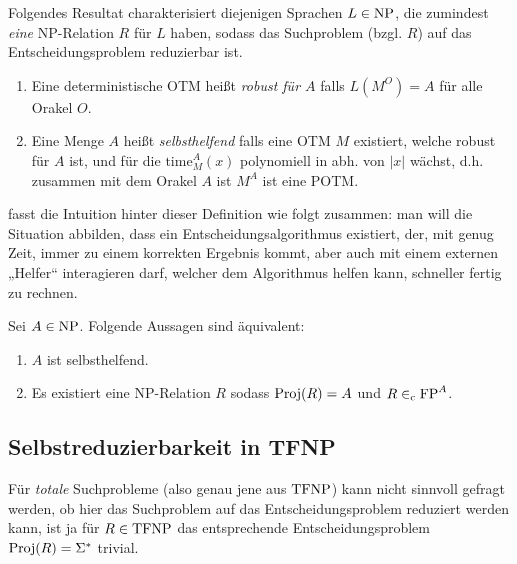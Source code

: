 Folgendes Resultat charakterisiert diejenigen Sprachen $L\in\mathrm{NP}$, die zumindest \emph{eine} NP-Relation $R$ für $L$ haben, sodass das Suchproblem (bzgl. $R$) auf das Entscheidungsproblem reduzierbar ist.
\begin{definition}
    \begin{enumerate}
        \item Eine deterministische OTM heißt \emph{robust für $A$} falls $L(M^O)=A$ für alle Orakel $O$.
        \item Eine Menge $A$ heißt \emph{selbsthelfend} falls eine OTM $M$ existiert, welche robust für $A$ ist, und für die $\mathrm{time}_M^A(x)$ polynomiell in abh. von $|x|$ wächst, d.h. zusammen mit dem Orakel $A$ ist $M^A$ ist eine POTM.\qedhere
    \end{enumerate}
\end{definition}
\citeauthor{balcazar_self_1989} fasst die Intuition hinter dieser Definition wie folgt zusammen: man will die Situation abbilden, dass ein Entscheidungsalgorithmus existiert, der, mit genug Zeit, immer zu einem korrekten Ergebnis kommt, aber auch mit einem externen „Helfer“ interagieren darf, welcher dem Algorithmus helfen kann, schneller fertig zu rechnen.
\begin{theorem}
    Sei $A\in \mathrm{NP}$. Folgende Aussagen sind äquivalent:
    \begin{enumerate}
        \item $A$ ist selbsthelfend.
        \item Es existiert eine NP-Relation $R$ sodass $\operatorname{Proj}(R)=A$ und $R\in_\mathrm{c} \mathrm{FP}^{A}$.
    \end{enumerate}
\end{theorem}

\subsection*{Selbstreduzierbarkeit in TFNP}

Für \emph{totale} Suchprobleme (also genau jene aus $\mathrm{TFNP}$) kann nicht sinnvoll gefragt werden, ob hier das Suchproblem auf das Entscheidungsproblem reduziert werden kann, ist ja für $R\in\mathrm{TFNP}$ das entsprechende Entscheidungsproblem $\operatorname{Proj}(R)=\Sigma^*$ trivial.

